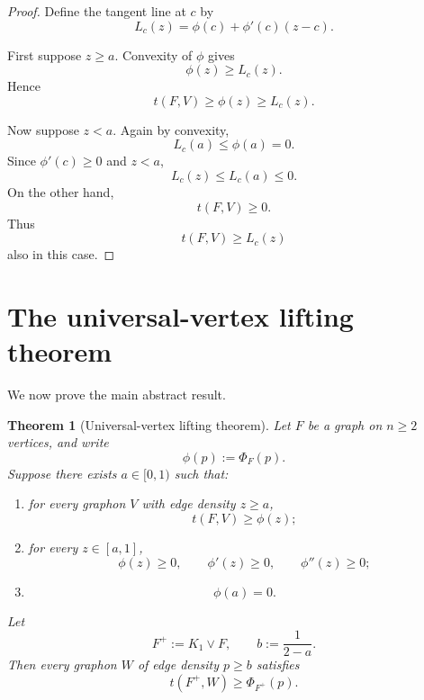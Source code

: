 \documentclass[11pt]{article}
\newtheorem{theorem}{Theorem}[section]
\newcommand{\1}{\mathbf{1}}
\newcommand{\join}{\vee}
\begin{document}
\begin{proof}
Define the tangent line at $c$ by
\[
L_c(z)
=
\phi(c)+\phi'(c)(z-c).
\]

First suppose $z\ge a$.  Convexity of $\phi$ gives
\[
\phi(z)\ge L_c(z).
\]
Hence
\[
t(F,V)\ge\phi(z)\ge L_c(z).
\]

Now suppose $z<a$.  Again by convexity,
\[
L_c(a)\le\phi(a)=0.
\]
Since $\phi'(c)\ge0$ and $z<a$,
\[
L_c(z)\le L_c(a)\le0.
\]
On the other hand,
\[
t(F,V)\ge0.
\]
Thus
\[
t(F,V)\ge L_c(z)
\]
also in this case.
\end{proof}


\section{The universal-vertex lifting theorem}

We now prove the main abstract result.

\begin{theorem}[Universal-vertex lifting theorem]
\label{thm:universal-lifting}
Let $F$ be a graph on $n\ge2$ vertices, and write
\[
\phi(p):=\Phi_F(p).
\]
Suppose there exists $a\in[0,1)$ such that:

\begin{enumerate}[label=\textnormal{(\roman*)}]
\item
for every graphon $V$ with edge density $z\ge a$,
\[
t(F,V)\ge\phi(z);
\]

\item
for every $z\in[a,1]$,
\[
\phi(z)\ge0,
\qquad
\phi'(z)\ge0,
\qquad
\phi''(z)\ge0;
\]

\item
\[
\phi(a)=0.
\]
\end{enumerate}

Let
\[
F^+:=K_1\join F,
\qquad
b:=\frac1{2-a}.
\]
Then every graphon $W$ of edge density $p\ge b$ satisfies
\[
\boxed{
t(F^+,W)\ge\Phi_{F^+}(p).
}
\]
\end{theorem}
\end{document}
